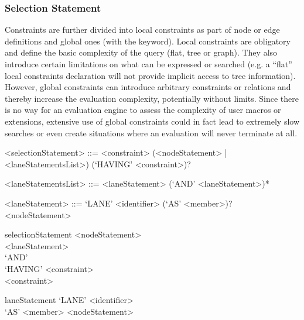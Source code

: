 \documentclass[11pt,a4paper]{article}
\begin{document}
\subsubsection{Selection Statement}
\label{sec:selection}

Constraints are further divided into local constraints as part of node or edge definitions and global ones (with the  keyword). 
Local constraints are obligatory and define the basic complexity of the query (flat, tree or graph). 
They also introduce certain limitations on what can be expressed or searched (e.g. a ``flat'' local constraints declaration will not provide implicit access to tree information). 
However, global constraints can introduce arbitrary constraints or relations and thereby increase the evaluation complexity, potentially without limits. 
Since there is no way for an evaluation engine to assess the complexity of user macros or extensions, extensive use of global constraints could in fact lead to extremely slow searches or even create situations where an evaluation will never terminate at all.

\begin{gram}
	\label{gram:selection}
	\begin{grammar}	
		<selectionStatement> ::= <constraint>
		\alt (<nodeStatement> | <laneStatementsList>) (`HAVING' <constraint>)?	
		
		<laneStatementsList> ::= <laneStatement> (`AND' <laneStatement>)*
		
		<laneStatement> ::= `LANE' <identifier> (`AS' <member>)? <nodeStatement>
	\end{grammar}
	\diagsep
	
	\begin{rrdiag*}{selectionStatement}
		\sst
			\sst <nodeStatement> \\ \srp <laneStatement> \\ `AND' \erp \est
				\sst \\ `HAVING' <constraint> \est \\ 
			<constraint> 
		\est
	\end{rrdiag*}

	\begin{rrdiag*}{laneStatement}
		`LANE' <identifier> \sst \\ `AS' <member> \est <nodeStatement>
	\end{rrdiag*}
\end{gram}

\end{document}

